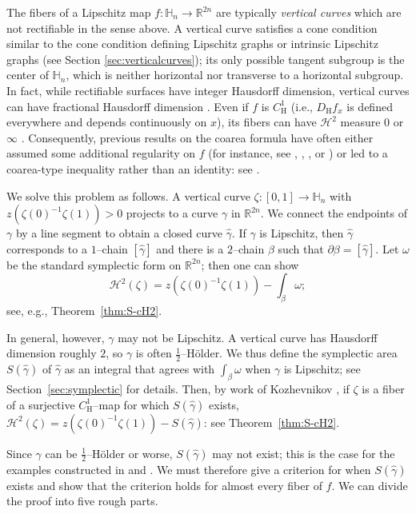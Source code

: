 \documentclass[12pt,reqno]{amsart}
\newcommand{\cH}{\mathcal{H}}
\newcommand{\DfH}{D_\mathrm{H}f}
\newcommand{\HH}{\mathbb{H}}
\newcommand{\R}{\mathbb{R}}
\newcommand{\from}{\colon}
\theoremstyle{remark}
\newcommand{\0}{\mathbf{0}}
\renewcommand{\1}{\mathbf 1}
\begin{document}
The fibers of a Lipschitz map $f\from \HH_n\to \R^{2n}$ are typically \emph{vertical curves} which are not rectifiable in the sense above. A vertical curve satisfies a cone condition similar to the cone condition defining Lipschitz graphs or intrinsic Lipschitz graphs (see Section \ref{sec:verticalcurves}); its only possible tangent subgroup is the center of $\HH_n$, which is neither horizontal nor transverse to a horizontal subgroup. In fact, while rectifiable surfaces have integer Hausdorff dimension, vertical curves can have fractional Hausdorff dimension \cite{AY-Vertical}. Even if $f$ is $C^1_\mathrm{H}$ (i.e., $\DfH_x$ is defined everywhere and depends continuously on $x$), its fibers can have $\mathcal{H}^2$ measure $0$ or $\infty$ \cite{Kozhevnikov}. Consequently, previous results on the coarea formula have often either assumed some additional regularity on $f$ (for instance, see \cite{KarmanovaVodopyanov}, \cite{MagnaniNonHorizontal}, \cite{Kozhevnikov}, or \cite{MagnaniStepanovTrevisan}) or led to a coarea-type inequality rather than an identity: see \cite[Theorem 2.6]{MagnaniCoareaInequality}.

We solve this problem as follows. A vertical curve $\zeta\from [0,1]\to \HH_n$ with $z(\zeta(0)^{-1}\zeta(1)) > 0$ projects to a curve $\gamma$ in $\R^{2n}$. We connect the endpoints of $\gamma$ by a line segment to obtain a closed curve $\hat{\gamma}$. If $\gamma$ is Lipschitz, then $\hat{\gamma}$ corresponds to a $1$--chain $[\hat{\gamma}]$ and there is a $2$--chain $\beta$ such that $\partial \beta = [\hat{\gamma}]$. Let $\omega$ be the standard symplectic form on $\R^{2n}$; then one can show
$$
\cH^2(\zeta) = z\left(\zeta(0)^{-1}\zeta(1)\right) - \int_\beta \omega;
$$
see, e.g., Theorem~\ref{thm:S-cH2}.

In general, however, $\gamma$ may not be Lipschitz. A vertical curve has Hausdorff dimension roughly $2$, so $\gamma$ is often $\frac{1}{2}$--Hölder. We thus define the symplectic area $S(\hat{\gamma})$ of $\hat{\gamma}$ as an integral that agrees with $\int_\beta \omega$ when $\gamma$ is Lipschitz; see Section~\ref{sec:symplectic} for details. Then, by work of Kozhevnikov \cite[Cor.\ 5.4.16]{Kozhevnikov}, if $\zeta$ is a fiber of a surjective $C^1_{\mathrm{H}}$--map for which $S(\hat\gamma)$ exists, $\cH^2(\zeta) = z(\zeta(0)^{-1}\zeta(1)) - S(\hat{\gamma})$: see Theorem~\ref{thm:S-cH2}.

Since $\gamma$ can be $\frac{1}{2}$--Hölder or worse, $S(\hat{\gamma})$ may not exist; this is the case for the examples constructed in \cite{Kozhevnikov} and \cite{AY-Vertical}. We must therefore give a criterion for when $S(\hat{\gamma})$ exists and show that the criterion holds for almost every fiber of $f$. We can divide the proof into five rough parts.
\end{document}
